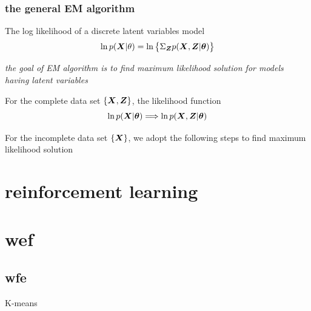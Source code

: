 \documentclass[11pt]{article}
\begin{document}
\subsubsection{the general EM algorithm}
\label{sec:org138aeb4}
The log likelihood of a discrete latent variables model
\begin{equation*}
\ln p(\boldsymbol{X}|\theta)=\ln\left\{\displaystyle\Sigma_{\boldsymbol{Z}} p(\boldsymbol{X},\boldsymbol{Z}|\boldsymbol{\theta})\right\}
\end{equation*}


\emph{the goal of EM algorithm is to find maximum likelihood solution for models
having latent variables} 


For the complete data set \(\left\{\boldsymbol{X},\boldsymbol{Z}\right\}\), the likelihood function
\begin{equation*}
\ln p(\boldsymbol{X}|\boldsymbol{\theta})\Longrightarrow \ln p(\boldsymbol{X},\boldsymbol{Z}|\boldsymbol{\theta})
\end{equation*}


For the incomplete data set \(\left\{\boldsymbol{X}\right\}\), we adopt the following steps to
find maximum likelihood solution
\section{reinforcement learning}
\label{sec:org052f646}

\section{wef}
\label{sec:org9d6a7c5}
\subsection{wfe}
\label{sec:orgf6341a5}
K-means
\end{document}
